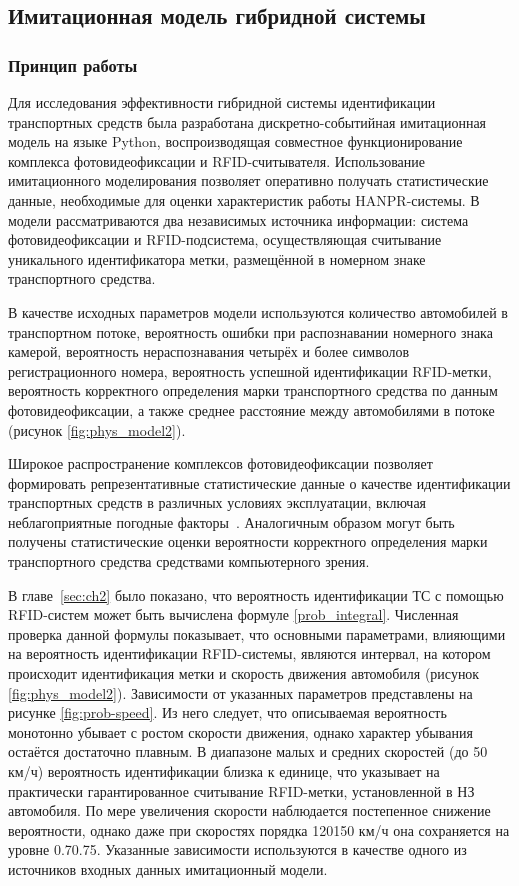 \documentclass[12pt]{article}
\theoremstyle{definition}
\begin{document}
\subsection{Имитационная модель гибридной системы}
\subsubsection{Принцип работы}

Для исследования эффективности гибридной системы идентификации транспортных средств была разработана дискретно-событийная имитационная модель на языке Python, воспроизводящая совместное функционирование комплекса фотовидеофиксации и RFID-считывателя. Использование имитационного моделирования позволяет оперативно получать статистические данные, необходимые для оценки характеристик работы HANPR-системы. В модели рассматриваются два независимых источника информации: система фотовидеофиксации и RFID-подсистема, осуществляющая считывание уникального идентификатора метки, размещённой в номерном знаке транспортного средства.

В качестве исходных параметров модели используются количество автомобилей в транспортном потоке, вероятность ошибки при распознавании номерного знака камерой, вероятность нераспознавания четырёх и более символов регистрационного номера, вероятность успешной идентификации RFID-метки, вероятность корректного определения марки транспортного средства по данным фотовидеофиксации, а также среднее расстояние между автомобилями в потоке (рисунок \ref{fig:phys_model2}).

Широкое распространение комплексов фотовидеофиксации позволяет формировать репрезентативные статистические данные о качестве идентификации транспортных средств в различных условиях эксплуатации, включая неблагоприятные погодные факторы~\cite{Plavac2024}. Аналогичным образом могут быть получены статистические оценки вероятности корректного определения марки транспортного средства средствами компьютерного зрения.

В главе~\ref{sec:ch2} было показано, что вероятность идентификации ТС с помощью RFID-систем может быть вычислена формуле \eqref{prob_integral}. Численная проверка данной формулы показывает, что основными параметрами, влияющими на вероятность идентификации RFID-системы, являются интервал, на котором происходит идентификация метки и скорость движения автомобиля (рисунок \ref{fig:phys_model2}). Зависимости от указанных параметров представлены на рисунке \ref{fig:prob-speed}. Из него следует, что описываемая вероятность монотонно убывает с ростом скорости движения, однако характер убывания остаётся достаточно плавным. В диапазоне малых и средних скоростей (до 50 км/ч) вероятность идентификации близка к единице, что указывает на практически гарантированное считывание RFID-метки, установленной в НЗ автомобиля. По мере увеличения скорости наблюдается постепенное снижение вероятности, однако даже при скоростях порядка 120150 км/ч она сохраняется на уровне 0.70.75. Указанные зависимости используются в качестве одного из источников входных данных имитационный модели.
\end{document}
